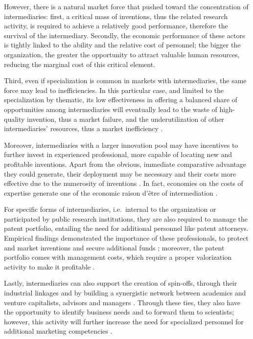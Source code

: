 However, there is a natural market force that pushed toward the concentration of intermediaries: first, a critical mass of inventions, thus the related research activity, is required to achieve a relatively good performance, therefore the survival of the intermediary. Secondly, the economic performance of these actors is tightly linked to the ability and the relative cost of personnel; the bigger the organization, the greater the opportunity to attract valuable human resources, reducing the marginal cost of this critical element.

Third, even if specialization is common in markets with intermediaries, the same force may lead to inefficiencies. In this particular case, and limited to the specialization by thematic, its low effectiveness in offering a balanced share of opportunities among intermediaries will eventually lead to the waste of high-quality invention, thus a market failure, and the underutilization of other intermediaries' resources, thus a market inefficiency \citep{Hoppe2005}.

Moreover, intermediaries with a larger innovation pool may have incentives to further invest in experienced professional, more capable of locating new and profitable inventions. Apart from the obvious, immediate comparative advantage they could generate, their deployment may be necessary and their costs more effective due to the numerosity of inventions \citep{Debackere2005}. In fact, economies on the costs of expertise generate one of the economic raison d'être of intermediation \citep{Hoppe2005}.

For specific forms of intermediaries, i.e.\ internal to the organization or participated by public research institutions, they are also required to manage the patent portfolio, entailing the need for additional personnel like patent attorneys. Empirical findings demonstrated the importance of these professionals, to protect and market inventions and secure additional funds \citep{Siegel2003a}; moreover, the patent portfolio comes with management costs, which require a proper valorization activity to make it profitable \citep{Balderi2010}.

Lastly, intermediaries can also support the creation of spin-offs, through their industrial linkages and by building a synergistic network between academics and venture capitalists, advisors and managers \citep{OShea2004}. Through these ties, they also have the opportunity to identify business needs and to forward them to scientists; however, this activity will further increase the need for specialized personnel for additional marketing competencies \citep{Geuna2009,Muscio2008}. 

